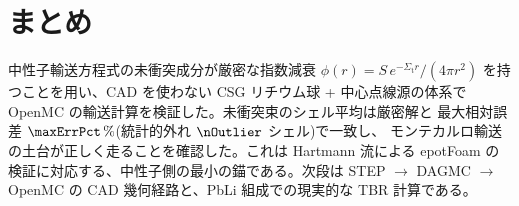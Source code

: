 \documentclass{ltjsarticle}   %
\newcommand{\Sigmat}{\Sigma_\mathrm{t}}
\begin{document}
\section{まとめ}

中性子輸送方程式の未衝突成分が厳密な指数減衰
$\phi(r)=S\,e^{-\Sigmat r}/(4\pi r^2)$ を持つことを用い、CAD を使わない CSG リチウム球
+ 中心点線源の体系で OpenMC の輸送計算を検証した。未衝突束のシェル平均は厳密解と
最大相対誤差 $\maxErrPct\,\%$(統計的外れ $\nOutlier$ シェル)で一致し、
モンテカルロ輸送の土台が正しく走ることを確認した。これは Hartmann 流による epotFoam の
検証に対応する、中性子側の最小の錨である。次段は STEP $\to$ DAGMC $\to$ OpenMC の
CAD 幾何経路と、PbLi 組成での現実的な TBR 計算である。



\end{document}
